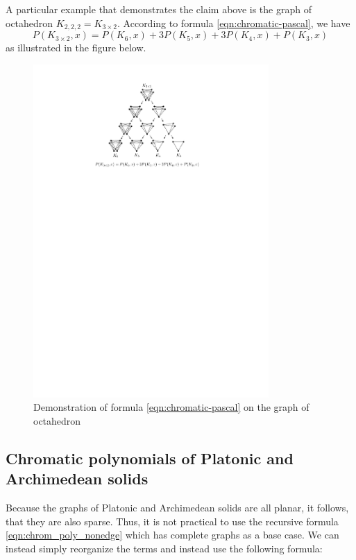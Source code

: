 A particular example that demonstrates the claim above is the graph of octahedron $K_{2,2,2} = K_{3 \times 2}$. According to formula \ref{eqn:chromatic-pascal}, we have \[ P(K_{3 \times 2},x) = P(K_6,x)+3P(K_5,x) + 3P(K_4,x)+P(K_3,x)\] as illustrated in the figure below.

\begin{figure}[H]
    \centering
    \includegraphics[width=0.8\textwidth]{Resources/Figs/octahedral_pascal_demo.pdf}
    \caption{Demonstration of formula \ref{eqn:chromatic-pascal} on the graph of octahedron}
\end{figure}

\subsection{Chromatic polynomials of Platonic and Archimedean solids}

Because the graphs of Platonic and Archimedean solids are all planar, it follows, that they are also sparse. Thus, it is not practical to use the recursive formula \ref{eqn:chrom_poly_nonedge} which has complete graphs as a base case. We can instead simply reorganize the terms and instead use the following formula:

